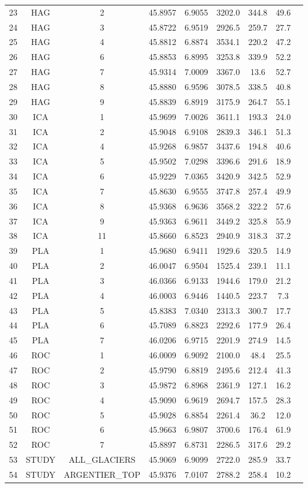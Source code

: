 \begin{table}[htbp]
{\begin{tabular}{|c|c|c|c|c|c|c|c|c|}
23 & HAG & 2 & 45.8957 & 6.9055 & 3202.0 & 344.8 & 49.6 \\
24 & HAG & 3 & 45.8722 & 6.9519 & 2926.5 & 259.7 & 27.7 \\
25 & HAG & 4 & 45.8812 & 6.8874 & 3534.1 & 220.2 & 47.2 \\
26 & HAG & 6 & 45.8853 & 6.8995 & 3253.8 & 339.9 & 52.2 \\
27 & HAG & 7 & 45.9314 & 7.0009 & 3367.0 & 13.6 & 52.7 \\
28 & HAG & 8 & 45.8880 & 6.9596 & 3078.5 & 338.5 & 40.8 \\
29 & HAG & 9 & 45.8839 & 6.8919 & 3175.9 & 264.7 & 55.1 \\
30 & ICA & 1 & 45.9699 & 7.0026 & 3611.1 & 193.3 & 24.0 \\
31 & ICA & 2 & 45.9048 & 6.9108 & 2839.3 & 346.1 & 51.3 \\
32 & ICA & 4 & 45.9268 & 6.9857 & 3437.6 & 194.8 & 40.6 \\
33 & ICA & 5 & 45.9502 & 7.0298 & 3396.6 & 291.6 & 18.9 \\
34 & ICA & 6 & 45.9229 & 7.0365 & 3420.9 & 342.5 & 52.9 \\
35 & ICA & 7 & 45.8630 & 6.9555 & 3747.8 & 257.4 & 49.9 \\
36 & ICA & 8 & 45.9368 & 6.9636 & 3568.2 & 322.2 & 57.6 \\
37 & ICA & 9 & 45.9363 & 6.9611 & 3449.2 & 325.8 & 55.9 \\
38 & ICA & 11 & 45.8660 & 6.8523 & 2940.9 & 318.3 & 37.2 \\
39 & PLA & 1 & 45.9680 & 6.9411 & 1929.6 & 320.5 & 14.9 \\
40 & PLA & 2 & 46.0047 & 6.9504 & 1525.4 & 239.1 & 11.1 \\
41 & PLA & 3 & 46.0366 & 6.9133 & 1944.6 & 179.0 & 21.2 \\
42 & PLA & 4 & 46.0003 & 6.9446 & 1440.5 & 223.7 & 7.3 \\
43 & PLA & 5 & 45.8383 & 7.0340 & 2313.3 & 300.7 & 17.7 \\
44 & PLA & 6 & 45.7089 & 6.8823 & 2292.6 & 177.9 & 26.4 \\
45 & PLA & 7 & 46.0206 & 6.9715 & 2201.9 & 274.9 & 14.5 \\
46 & ROC & 1 & 46.0009 & 6.9092 & 2100.0 & 48.4 & 25.5 \\
47 & ROC & 2 & 45.9790 & 6.8819 & 2495.6 & 212.4 & 41.3 \\
48 & ROC & 3 & 45.9872 & 6.8968 & 2361.9 & 127.1 & 16.2 \\
49 & ROC & 4 & 45.9090 & 6.9619 & 2694.7 & 157.5 & 28.3 \\
50 & ROC & 5 & 45.9028 & 6.8854 & 2261.4 & 36.2 & 12.0 \\
51 & ROC & 6 & 45.9663 & 6.9807 & 3700.6 & 176.4 & 61.9 \\
52 & ROC & 7 & 45.8897 & 6.8731 & 2286.5 & 317.6 & 29.2 \\
53 & STUDY & ALL_GLACIERS & 45.9069 & 6.9099 & 2722.0 & 285.9 & 33.7 \\
54 & STUDY & ARGENTIER_TOP & 45.9376 & 7.0107 & 2788.2 & 258.4 & 10.2 \\
\hline


\end{tabular}}
\end{table}
